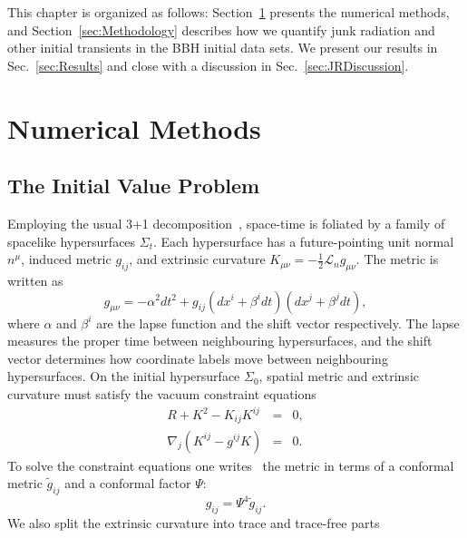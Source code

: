 This chapter is organized as follows: 
  Section~\ref{sec:NumericalMethods} presents the numerical methods,
  and Section~\ref{sec:Methodology} describes how we quantify junk
  radiation and other initial transients in the BBH initial data sets.
  We present our results in Sec.~\ref{sec:Results} and close with a discussion in Sec.~\ref{sec:JRDiscussion}.

\section{Numerical Methods}
\label{sec:NumericalMethods}

\subsection{The Initial Value Problem}
\label{subsec:IVP}
Employing the usual 3+1 decomposition~\citep{ADM,york79}, space-time is foliated by a family
of spacelike hypersurfaces $\Sigma_t$. Each hypersurface has a
future-pointing unit normal $n^{\mu}$, induced metric $g_{ij}$, and
extrinsic curvature
$K_{\mu\nu}=-\frac{1}{2}\mathcal{L}_{n}g_{\mu\nu}$. The metric is
written as 
\begin{equation}
g_{\mu\nu}=-\alpha^2dt^2+g_{ij}\left(dx^i+\beta^idt\right)\left(dx^j+\beta^jdt\right),
\end{equation}
where $\alpha$ and $\beta^i$ are the lapse function and the shift vector
respectively. The lapse measures the proper time between neighbouring
hypersurfaces, and the shift vector determines how coordinate labels
move between neighbouring hypersurfaces.  On the initial
hypersurface $\Sigma_0$, spatial metric and extrinsic curvature must satisfy the vacuum
constraint equations
\begin{eqnarray}
R+K^2-K_{ij}K^{ij}&=&0, \\
\nabla_j\left(K^{ij}-g^{ij}K\right)&=&0.
\end{eqnarray}
To solve the constraint equations one writes~\citep{Lichnerowicz44}
the metric in terms of a conformal metric $\tilde{g}_{ij}$ and a
conformal factor $\Psi$:
\begin{equation}
g_{ij}=\Psi^4\tilde{g}_{ij}.
\end{equation}
We also split the extrinsic curvature into trace and trace-free parts
